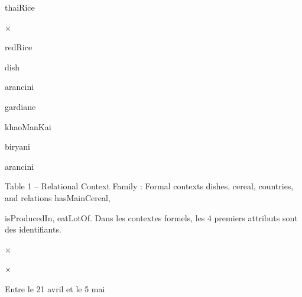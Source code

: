\documentclass[a4paper,portrait,12pt]{article}
\begin{document}
\begin{flushleft}
thaiRice
\end{flushleft}





×





\begin{flushleft}
redRice
\end{flushleft}





\begin{flushleft}
dish
\end{flushleft}


\begin{flushleft}
arancini
\end{flushleft}


\begin{flushleft}
gardiane
\end{flushleft}


\begin{flushleft}
khaoManKai
\end{flushleft}


\begin{flushleft}
biryani
\end{flushleft}





\begin{flushleft}
arancini
\end{flushleft}





\begin{flushleft}
Table 1 -- Relational Context Family : Formal contexts dishes, cereal, countries, and relations hasMainCereal,
\end{flushleft}


\begin{flushleft}
isProducedIn, eatLotOf. Dans les contextes formels, les 4 premiers attributs sont des identifiants.
\end{flushleft}





×


×





\begin{flushleft}
Entre le 21 avril et le 5 mai
\end{flushleft}
\end{document}
